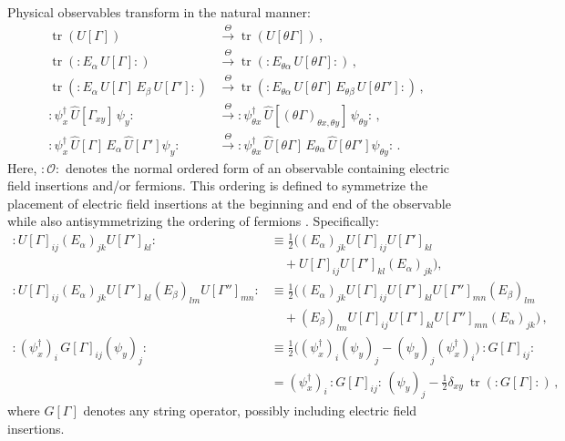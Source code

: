 \documentclass [12pt]{article}
\newcommand{\tr}{\mathop{\mathrm{tr}}}
\begin{document}
    Physical observables transform in the natural manner:%
    \begin{subequations}\label{eq:latttrans}
    \begin{align}
	\tr(U[\Gamma])
	&\xrightarrow{\Theta}
	\tr(U[\theta\Gamma]) \,,
    \\
	\tr({:}E_\alpha \, U[\Gamma]{:})
	&\xrightarrow{\Theta}
	\tr({:}E_{\theta\alpha} \, U[\theta\Gamma]{:}) \,,
    \\
	\tr({:}E_\alpha \, U[\Gamma] \, E_\beta \, U[\Gamma']{:})
	&\xrightarrow{\Theta}
	\tr({:}E_{\theta\alpha} \, U[\theta\Gamma] \, E_{\theta\beta} \, U[\theta\Gamma']{:}) \,,
    \\
	{:} \psi_x^\dagger \, \hat U[\Gamma_{xy}] \, \psi_y {:}
	&\xrightarrow{\Theta}
	{:} \psi_{\theta x}^\dagger \, \hat U[(\theta\Gamma)_{\theta x, \theta y}] \,
	    \psi_{\theta y} {:} \,,
	\label{eq:transferm}
    \\
	{:} \psi_x^\dagger \, \hat U[\Gamma] \, E_\alpha \, \hat U[\Gamma'] \psi_y {:}
	&\xrightarrow{\Theta}
	{:} \psi_{\theta x}^\dagger \, \hat U[\theta\Gamma] \,
	    E_{\theta\alpha} \, \hat U[\theta\Gamma'] \psi_{\theta y} {:} \,.
	\label{eq:transEferm}
    \end{align}
    \end{subequations}
    Here, ${:}\mathcal O{:}$ denotes the 
    normal ordered form of an observable containing
    electric field insertions and/or fermions.
    This ordering is defined to symmetrize the placement of electric field insertions
    at the beginning and end of the observable while also antisymmetrizing the ordering
    of fermions \cite{CSVAII}.  Specifically:
    \begin{subequations}
    \begin{align}
	:U[\Gamma]_{ij} (E_\alpha)_{jk} U[\Gamma']_{kl}:
	& \equiv
	\tfrac 12
	\bigl( (E_\alpha)_{jk} U[\Gamma]_{ij} U[\Gamma']_{kl}
    \nonumber
    \\ &\quad{}
	+
	U[\Gamma]_{ij} U[\Gamma']_{kl} (E_\alpha)_{jk} \bigr) ,
    \\[3pt]
	:U[\Gamma]_{ij} (E_\alpha)_{jk} U[\Gamma']_{kl} (E_\beta)_{lm} U[\Gamma'']_{mn}:
	& \equiv
	\tfrac 12
	\bigl(
	    (E_\alpha)_{jk} U[\Gamma]_{ij} U[\Gamma']_{kl} U[\Gamma'']_{mn} (E_\beta)_{lm}
    \nonumber
    \\ &\quad{}
	+
	    (E_\beta)_{lm} U[\Gamma]_{ij} U[\Gamma']_{kl} U[\Gamma'']_{mn} (E_\alpha)_{jk}
	\bigr) \,,
    \\
	:(\psi_x^\dagger)_i \, G[\Gamma]_{ij} (\psi_y)_j:
	& \equiv
	\tfrac 12
	\bigl(
	    (\psi_x^\dagger)_i (\psi_y)_j
	    -
	    (\psi_y)_j (\psi_x^\dagger)_i
	\bigr) \,
	{:} G[\Gamma]_{ij} {:}
    \nonumber
    \\ &=
	(\psi_x^\dagger)_i \, {:}G[\Gamma]_{ij}{:} \, (\psi_y)_j
	-\tfrac 12
	\delta_{xy} \> \tr ({:}G[\Gamma]{:}) \,,
    \label{eq:normordferm}
    \end{align}
    \end{subequations}
    where $G[\Gamma]$ denotes any string operator, possibly
    including electric field insertions.
    
\end{document}
